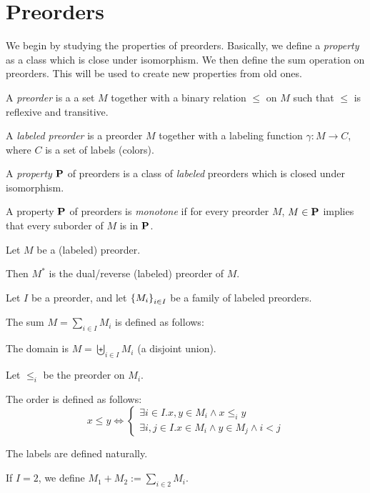\section{Preorders}

We begin by studying the properties of preorders.
Basically, we define a \emph{property} as a class which is 
close under isomorphism. We then define
the sum operation on preorders. This will be used
to create new properties from old ones.

\begin{definitions}
  A \emph{preorder} is a a set $M$
  together with a binary relation $\le$ on $M$ such that
  $\le$ is reflexive and transitive.

  A \emph{labeled preorder} is a preorder $M$ together with a labeling function
  $\gamma : M \to C$, where $C$ is a set of labels (colors).
\end{definitions}

\begin{definition}
  A \emph{property} $\mathbf{P}$ of preorders is a class of \emph{labeled} preorders which
  is closed under isomorphism.
\end{definition}

\begin{definition}
  A property $\mathbf{P}$ of preorders is \emph{monotone} if for every preorder $M$,
  $M \in \mathbf{P}$ implies that every suborder of $M$ is in $\mathbf{P}$.
\end{definition}

\begin{definition}
  Let $M$ be a (labeled) preorder.

  Then $M^\ast$ is the dual/reverse (labeled) preorder of $M$.
\end{definition}

\begin{definition}
  Let $I$ be a preorder, and let $\left\{ {M_i} \right\}_{i \in I}$ be a family of labeled preorders.

  The sum $M = \sum_{i \in I} M_i$ is defined as follows:

  The domain is $M = \biguplus_{i \in I} M_i$ (a disjoint union).

  Let $\le_i$ be the preorder on $M_i$.

  The order is defined as follows:
  \[
    x \le y \iff \begin{cases}
      \exists i \in I. x, y \in M_i \land x \le_i y \\
      \exists i, j \in I. x \in M_i \land y \in M_j \land i < j
    \end{cases}
  \]

  The labels are defined naturally.

  If $I = 2$, we define $M_1 + M_2 := \sum_{i \in 2} M_i$.
\end{definition}

